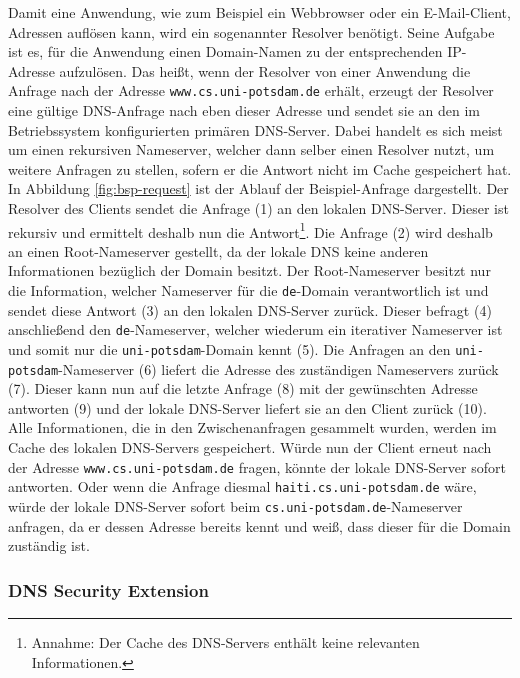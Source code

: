 \documentclass[a4paper, 12pt, BCOR10mm, DIV12, toc=bibliography, toc=listof, german]{scrbook}
\begin{document}
				Damit eine Anwendung, wie zum Beispiel ein Webbrowser oder ein E-Mail-Client, Adressen
				auflösen kann, wird ein sogenannter Resolver benötigt. Seine Aufgabe ist es, für die
				Anwendung einen Domain-Namen zu der entsprechenden IP-Adresse aufzulösen. Das heißt, wenn
				der Resolver von einer Anwendung die Anfrage nach der Adresse \texttt{www.cs.uni-potsdam.de}
				erhält, erzeugt der Resolver eine gültige DNS-Anfrage \cite{rfc1035} nach eben dieser
				Adresse und sendet sie an den im Betriebssystem konfigurierten primären DNS-Server. Dabei
				handelt es sich meist um einen rekursiven Nameserver, welcher dann selber einen Resolver
				nutzt, um weitere Anfragen zu stellen, sofern er die Antwort nicht im Cache gespeichert hat.
				In Abbildung \ref{fig:bsp-request} ist der Ablauf der Beispiel-Anfrage dargestellt. Der
				Resolver des Clients sendet die Anfrage (1) an den lokalen DNS-Server. Dieser ist rekursiv
				und ermittelt deshalb nun die Antwort\footnote{Annahme: Der Cache des DNS-Servers enthält
				keine relevanten Informationen.}. Die Anfrage (2) wird deshalb an einen Root-Nameserver
				gestellt, da der lokale DNS keine anderen Informationen bezüglich der Domain besitzt. Der
				Root-Nameserver besitzt nur die Information, welcher Nameserver für die \texttt{de}-Domain
				verantwortlich ist und sendet diese Antwort (3) an den lokalen DNS-Server zurück. Dieser
				befragt (4) anschließend den \texttt{de}-Nameserver, welcher wiederum ein iterativer
				Nameserver ist und somit nur die \texttt{uni-potsdam}-Domain kennt (5). Die Anfragen an den
				\texttt{uni-potsdam}-Nameserver (6) liefert die Adresse des zuständigen Nameservers zurück
				(7). Dieser kann nun auf die letzte Anfrage (8) mit der gewünschten Adresse antworten (9)
				und der lokale DNS-Server liefert sie an den Client zurück (10). Alle Informationen, die in
				den Zwischenanfragen gesammelt wurden, werden im Cache des lokalen DNS-Servers gespeichert.
				Würde nun der Client erneut nach der Adresse \texttt{www.cs.uni-potsdam.de} fragen, könnte
				der lokale DNS-Server sofort antworten. Oder wenn die Anfrage diesmal
				\texttt{haiti.cs.uni-potsdam.de} wäre, würde der lokale DNS-Server sofort beim
				\texttt{cs.uni-potsdam.de}-Nameserver anfragen, da er dessen Adresse bereits kennt und weiß,
				dass dieser für die Domain zuständig ist.


			\subsubsection*{DNS Security Extension} %
\end{document}
